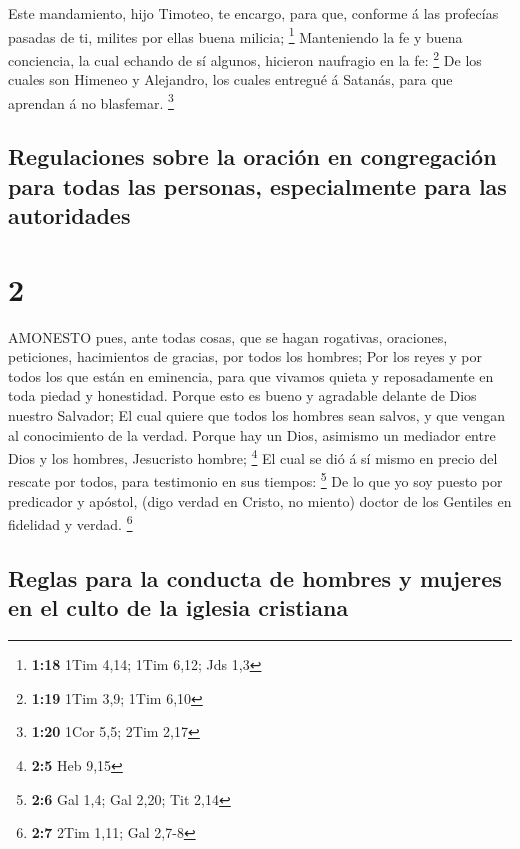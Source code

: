  Este mandamiento, hijo Timoteo, te encargo, para que,
conforme á las profecías pasadas de ti, milites por ellas buena milicia;
\footnote{\textbf{1:18} 1Tim 4,14; 1Tim 6,12; Jds 1,3} 
Manteniendo la fe y buena conciencia, la cual echando de sí algunos,
hicieron naufragio en la fe: \footnote{\textbf{1:19} 1Tim 3,9; 1Tim 6,10}
 De los cuales son Himeneo y Alejandro, los cuales entregué
á Satanás, para que aprendan á no blasfemar. \footnote{\textbf{1:20}
  1Cor 5,5; 2Tim 2,17}

\hypertarget{regulaciones-sobre-la-oraciuxf3n-en-congregaciuxf3n-para-todas-las-personas-especialmente-para-las-autoridades}{%
\subsection{Regulaciones sobre la oración en congregación para todas las
personas, especialmente para las
autoridades}\label{regulaciones-sobre-la-oraciuxf3n-en-congregaciuxf3n-para-todas-las-personas-especialmente-para-las-autoridades}}

\hypertarget{section-1}{%
\section{2}\label{section-1}}

 AMONESTO pues, ante todas cosas, que se hagan rogativas,
oraciones, peticiones, hacimientos de gracias, por todos los hombres;
 Por los reyes y por todos los que están en eminencia, para
que vivamos quieta y reposadamente en toda piedad y honestidad.
 Porque esto es bueno y agradable delante de Dios nuestro
Salvador;  El cual quiere que todos los hombres sean salvos,
y que vengan al conocimiento de la verdad.  Porque hay un
Dios, asimismo un mediador entre Dios y los hombres, Jesucristo hombre;
\footnote{\textbf{2:5} Heb 9,15}  El cual se dió á sí mismo
en precio del rescate por todos, para testimonio en sus tiempos:
\footnote{\textbf{2:6} Gal 1,4; Gal 2,20; Tit 2,14}  De lo
que yo soy puesto por predicador y apóstol, (digo verdad en Cristo, no
miento) doctor de los Gentiles en fidelidad y verdad. \footnote{\textbf{2:7}
  2Tim 1,11; Gal 2,7-8}

\hypertarget{reglas-para-la-conducta-de-hombres-y-mujeres-en-el-culto-de-la-iglesia-cristiana}{%
\subsection{Reglas para la conducta de hombres y mujeres en el culto de
la iglesia
cristiana}\label{reglas-para-la-conducta-de-hombres-y-mujeres-en-el-culto-de-la-iglesia-cristiana}}

